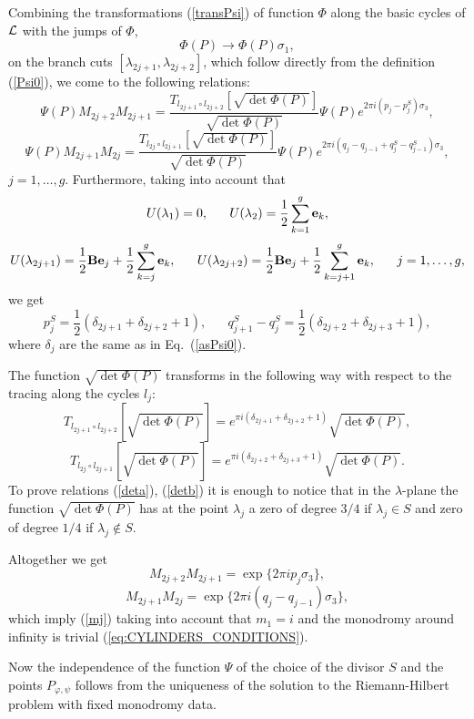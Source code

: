 \documentclass[11pt]{article}
\def\be{\begin{equation}}
\def\ee{\end{equation}}
\def\ben{\begin{displaymath}}
\def\een{\end{displaymath}}
\def\l{\lambda}
\def\phi{\varphi}
\def\eb{{\bf e}}
\def\B{{\bf B}}
\def\la{\label}
\def\f{\frac}
\def\L{{\cal L}}
\def\0{S}
\begin{document}
Combining the transformations (\ref{transPsi}) of function $\Phi$ along the basic cycles of $\L$ with the jumps of $\Phi$, 
\ben
\Phi(P)\rightarrow \Phi(P)\sigma_1,
\een
on the branch cuts $[\l_{2j+1},\l_{2j+2}]$, which follow directly from the definition (\ref{Psi0}), we come to the following relations:
\be
\Psi(P) M_{2j+2} M_{2j+1} = \f{T_{l_{2j+1}\circ l_{2j+2}}[\sqrt{\det\Phi(P)}]}
{\sqrt{\det\Phi(P)}}\Psi(P)e^{2\pi i (p_j-p^\0_j)\sigma_3},
\ee
\be
\Psi(P) M_{2j+1} M_{2j}= \f{T_{l_{2j}\circ l_{2j+1}}[\sqrt{\det\Phi(P)}]}
{\sqrt{\det\Phi(P)}}\Psi(P)
e^{2\pi i (q_j-q_{j-1}+q^\0_j-q^\0_{j-1})\sigma_3},
\ee
$j=1,\dots,g$. Furthermore, taking into account that 
\ben
U(\l_1)=0,\;\;\;\;\;\; U(\l_2)=\f12\sum_{k=1}^g\eb_k,
\een
\be
U(\l_{2j+1})= \f12\B\eb_j+ \f12\sum_{k=j}^g\eb_k,
\;\;\;\;\;\;
U(\l_{2j+2})= \f12\B\eb_j+  \f12\sum_{k=j+1}^g\eb_k,\;\;\;\;\;\;
j=1,\dots,g,
\la{Uj}
\ee
we get
\be
p^\0_j=\f12(\delta_{2j+1}+\delta_{2j+2}+1),\;\;\;\;\;\;
q^\0_{j+1}-q^\0_{j}=\f12(\delta_{2j+2}+\delta_{2j+3}+1),
\la{p0q0}\ee
where $\delta_j$ are the same as in Eq.~(\ref{asPsi0}).

The function $\sqrt{\det\Phi(P)}$ transforms in the following way with respect to the tracing along the cycles $l_j$:
\be
T_{l_{2j+1}\circ l_{2j+2}}[\sqrt{\det\Phi(P)}]= 
e^{\pi i (\delta_{2j+1}+\delta_{2j+2}+1)}\sqrt{\det\Phi(P)},  
\la{deta}
\ee
\be
T_{l_{2j}\circ l_{2j+1}}[\sqrt{\det\Phi(P)}]=
e^{\pi i (\delta_{2j+2}+\delta_{2j+3}+1)}\sqrt{\det\Phi(P)}.
\la{detb}
\ee
To prove relations (\ref{deta}), (\ref{detb}) it is enough to notice that in the $\l$-plane the function $\sqrt{\det\Phi(P)}$ has at the point $\l_j$ a zero of degree $3/4$ if $\l_j\in S$ and zero of degree $1/4$ if  $\l_j\not\in S$.

Altogether we get
\ben
M_{2j+2} M_{2j+1}=\exp\{2\pi i p_j\sigma_3\},
\een
\ben
M_{2j+1} M_{2j}=\exp\{2\pi i (q_j-q_{j-1})\sigma_3\},
\een
which imply (\ref{mj}) taking into account that $m_1=i$ and the monodromy around infinity is trivial (\ref{eq:CYLINDERS_CONDITIONS}). 

Now the independence of the function $\Psi$ of the choice of the divisor $S$ and the points  $P_{\phi,\psi}$ follows from the uniqueness of the solution to the Riemann-Hilbert problem with fixed monodromy data.
\end{document}
